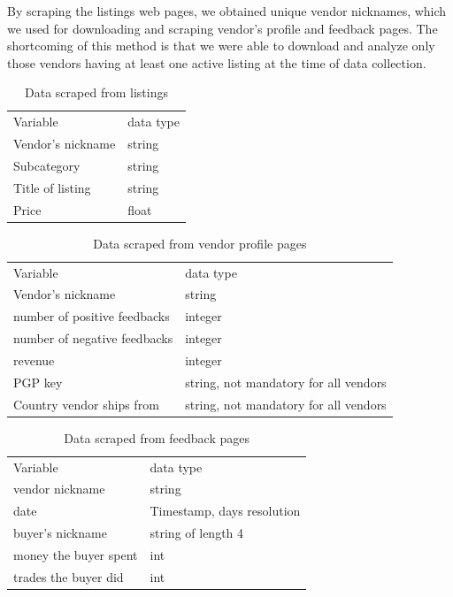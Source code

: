 \documentclass[
  digital, %
  table,   %
  lof,     %
  lot,     %
  oneside
]{fithesis3}
\begin{document}
By scraping the listings web pages, we obtained unique vendor nicknames,
which we used for downloading and scraping vendor's profile and feedback pages.
The shortcoming of this method is that we were able to download and analyze only those vendors
having at least one active listing at the time of data collection. 


\begin{table}
    \caption{Data scraped from listings}
    \label{datalist}
    \begin{tabular}{|l|l|}
 Variable & data type\\
 Vendor's nickname & string\\
 Subcategory & string\\
 Title of listing & string\\
 Price & float\\
    \end{tabular}
\end{table}

\begin{table}
    \caption{Data scraped from vendor profile pages}
    \label{datavendor}
    \begin{tabular}{|l|l|}
Variable & data type\\
Vendor's nickname & string\\
number of positive feedbacks & integer\\
number of negative feedbacks & integer\\
revenue & integer \\
PGP key & string, not mandatory for all vendors\\
Country vendor ships from & string, not mandatory for all vendors\\
    \end{tabular}
\end{table}

\begin{table}
    \caption{Data scraped from feedback pages}
    \label{datafeedback}
    \begin{tabular}{|l|l|}
 Variable & data type\\
vendor nickname & string\\
date & Timestamp, days resolution\\
buyer's nickname & string of length 4\\
money the buyer spent & int\\
trades the buyer did & int\\
   
    \end{tabular}
\end{table}
\end{document}
